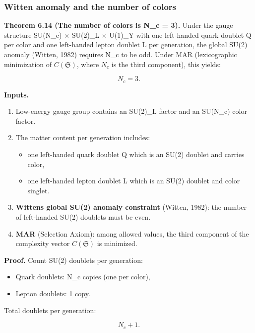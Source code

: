 \subsubsection{Witten anomaly and the number of colors}\label{69-witten-anomaly-and-the-number-of-colors}

\textbf{Theorem 6.14 (The number of colors is N\_c = 3).} Under the gauge structure SU(N\_c) \ensuremath{\times} SU(2)\_L \ensuremath{\times} U(1)\_Y with one left-handed quark doublet Q per color and one left-handed lepton doublet L per generation, the global SU(2) anomaly (Witten, 1982) requires N\_c to be odd. Under MAR (lexicographic minimization of \(C(\mathfrak S)\), where \(N_c\) is the third component), this yields:

\[
N_c = 3.
\]

\textbf{Inputs.}

\begin{enumerate}
\def\labelenumi{\arabic{enumi}.}
\tightlist
\item
  Low-energy gauge group contains an SU(2)\_L factor and an SU(N\_c) color factor.
\item
  The matter content per generation includes:

  \begin{itemize}
  \tightlist
  \item
    one left-handed quark doublet Q which is an SU(2) doublet and carries color,
  \item
    one left-handed lepton doublet L which is an SU(2) doublet and color singlet.
  \end{itemize}
\item
  \textbf{Witten\textquotesingle s global SU(2) anomaly constraint} (Witten, 1982): the number of left-handed SU(2) doublets must be even.
\item
  \textbf{MAR} (Selection Axiom): among allowed values, the third component of the complexity vector \(C(\mathfrak S)\) is minimized.
\end{enumerate}

\textbf{Proof.} Count SU(2) doublets per generation:

\begin{itemize}
\tightlist
\item
  Quark doublets: N\_c copies (one per color),
\item
  Lepton doublets: 1 copy.
\end{itemize}

Total doublets per generation:

\[
N_c + 1.
\]

